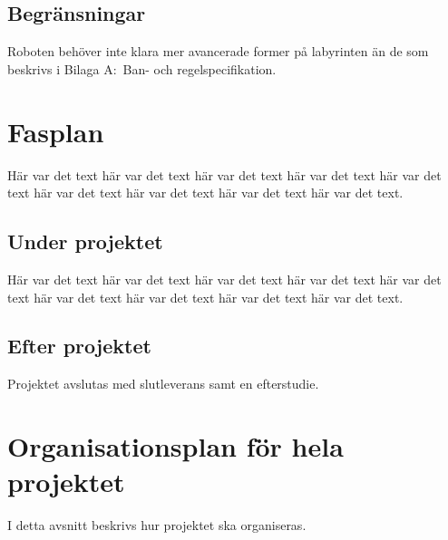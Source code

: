 \documentclass[a4paper,titlepage,12pt]{article}
\begin{document}
	
	\subsection{Begränsningar}
	Roboten behöver inte klara mer avancerade former på labyrinten än de som
    beskrivs i Bilaga A:\ Ban- och regelspecifikation.
	
	
	\section{Fasplan}
	Här var det text här var det text här var det text
	här var det text här var det text här var det text
	här var det text här var det text här var det text.
	
	
	
	\subsection{Under projektet}
	Här var det text här var det text här var det text
	här var det text här var det text här var det text
	här var det text här var det text här var det text.
	
	
	\subsection{Efter projektet}
    Projektet avslutas med slutleverans samt en efterstudie.
	
	
	\section{Organisationsplan för hela projektet}
    I detta avsnitt beskrivs hur projektet ska organiseras.
\end{document}
